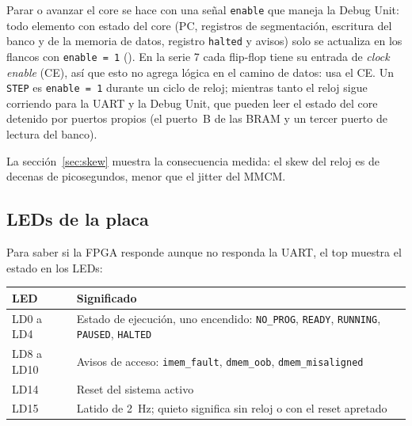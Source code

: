 Parar o avanzar el core se hace con una señal \texttt{enable} que maneja la Debug Unit: todo
elemento con estado del core (PC, registros de segmentación, escritura del banco y de la memoria
de datos, registro \texttt{halted} y avisos) solo se actualiza en los flancos con
\texttt{enable = 1} (). En la serie 7 cada flip-flop tiene su entrada de
\emph{clock enable} (CE), así que esto no agrega lógica en el camino de datos: usa el CE. Un
\texttt{STEP} es \texttt{enable = 1} durante un ciclo de reloj; mientras tanto el reloj sigue
corriendo para la UART y la Debug Unit, que pueden leer el estado del core detenido por puertos
propios (el puerto~B de las BRAM y un tercer puerto de lectura del banco).

La sección~\ref{sec:skew} muestra la consecuencia medida: el skew del reloj es de decenas de
picosegundos, menor que el jitter del MMCM.

\subsection{LEDs de la placa}

Para saber si la FPGA responde aunque no responda la UART, el top muestra el estado en los LEDs:

\begin{center}
\small
\begin{tabular}{@{}l l@{}}
  \toprule
  \textbf{LED} & \textbf{Significado} \\
  \midrule
  LD0 a LD4   & Estado de ejecución, uno encendido: \texttt{NO\_PROG}, \texttt{READY}, \texttt{RUNNING}, \texttt{PAUSED}, \texttt{HALTED} \\
  LD8 a LD10  & Avisos de acceso: \texttt{imem\_fault}, \texttt{dmem\_oob}, \texttt{dmem\_misaligned} \\
  LD14        & Reset del sistema activo \\
  LD15        & Latido de \qty{2}{\hertz}; quieto significa sin reloj o con el reset apretado \\
  \bottomrule
\end{tabular}
\end{center}
